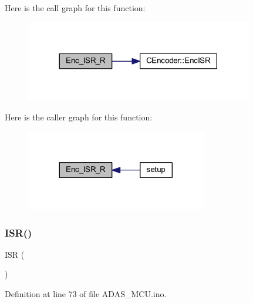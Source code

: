 Here is the call graph for this function\+:
\nopagebreak
\begin{figure}[H]
\begin{center}
\leavevmode
\includegraphics[width=281pt]{_a_d_a_s___m_c_u_8ino_a13fba9b7b9c02542e403a1142b5ad344_cgraph}
\end{center}
\end{figure}
Here is the caller graph for this function\+:
\nopagebreak
\begin{figure}[H]
\begin{center}
\leavevmode
\includegraphics[width=224pt]{_a_d_a_s___m_c_u_8ino_a13fba9b7b9c02542e403a1142b5ad344_icgraph}
\end{center}
\end{figure}
\mbox{\label{_a_d_a_s___m_c_u_8ino_a63a86aad9ba2e355fe6380da553f554e}} 
\subsubsection{\texorpdfstring{I\+S\+R()}{ISR()}}
{\footnotesize\ttfamily I\+SR (\begin{DoxyParamCaption}\item[{U\+S\+A\+R\+T2\+\_\+\+R\+X\+\_\+vect}]{ }\end{DoxyParamCaption})}



Definition at line 73 of file A\+D\+A\+S\+\_\+\+M\+C\+U.\+ino.

